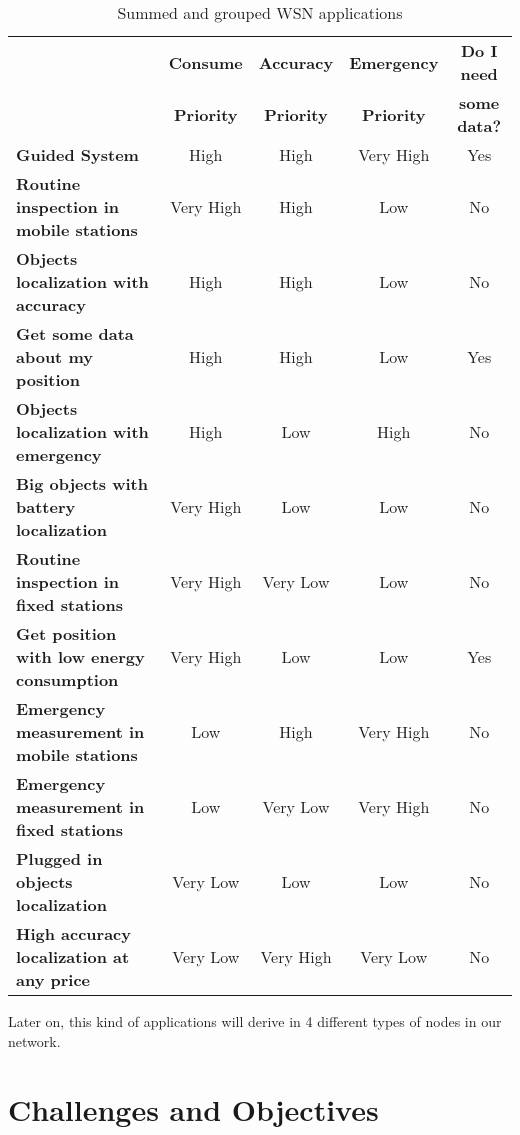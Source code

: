 \begin{table}[h]\footnotesize
\begin{center}
 \begin{tabular}{l||cccc}
  \noalign{\vspace*{0.5cm}}
  & \textbf{Consume} & \textbf{Accuracy} & \textbf{Emergency} & \textbf{Do I need} \\
  & \textbf{Priority} & \textbf{Priority} & \textbf{Priority} & \textbf{some data?} \\
  \hline\hline
  \textbf{Guided System} & High & High & Very High & Yes \\
  \hline 
  \textbf{Routine inspection in mobile stations} & Very High & High & Low & No \\
  \hline
  \textbf{Objects localization with accuracy} & High & High & Low & No \\
  \hline
  \textbf{Get some data about my position} & High & High & Low & Yes \\
  \hline
  \textbf{Objects localization with emergency} & High & Low & High & No \\
  \hline
  \textbf{Big objects with battery localization} & Very High & Low & Low & No \\
  \hline
  \textbf{Routine inspection in fixed stations} & Very High & Very Low & Low & No \\
  \hline
  \textbf{Get position with low energy consumption} & Very High & Low & Low & Yes \\
  \hline
  \textbf{Emergency measurement in mobile stations} & Low & High & Very High & No \\
  \hline
  \textbf{Emergency measurement in fixed stations} & Low & Very Low & Very High & No \\
  \hline
  \textbf{Plugged in objects localization} & Very Low & Low & Low & No \\
  \hline
  \textbf{High accuracy localization at any price} & Very Low & Very High & Very Low & No \\
  \hline
  \end{tabular}
 \caption{Summed and grouped \ac{WSN} applications}
 \label{tab:wsn_applications}
\end{center}
\end{table}

Later on, this kind of applications will derive in 4 different types of nodes in our network.

\section{Challenges and Objectives}

